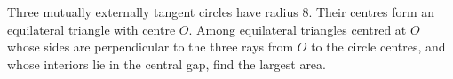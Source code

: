 Three mutually externally tangent circles have radius $8$. Their centres form an equilateral triangle with centre $O$. Among equilateral triangles centred at $O$ whose sides are perpendicular to the three rays from $O$ to the circle centres, and whose interiors lie in the central gap, find the largest area.

